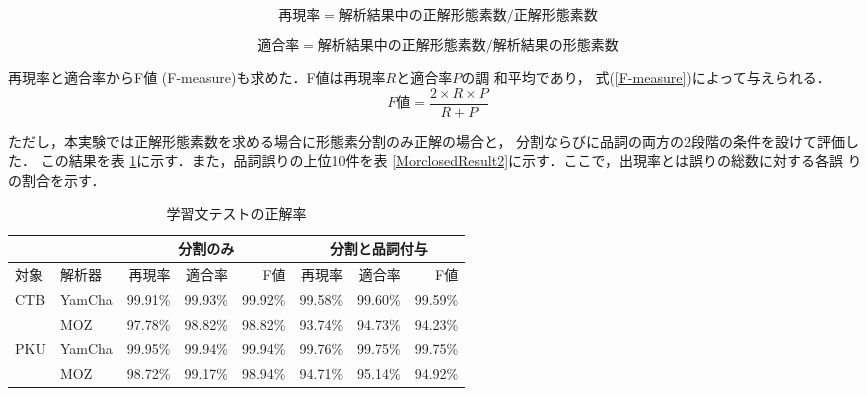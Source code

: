 \begin{equation}
 再現率 = 解析結果中の正解形態素数 / 正解形態素数
\label{recall}
\end{equation}

\begin{equation}
 適合率 = 解析結果中の正解形態素数 / 解析結果の形態素数
\label{precision} 
\end{equation}

再現率と適合率からF値 (F-measure)も求めた．F値は再現率$R$と適合率$P$の調
和平均であり，
式(\ref{F-measure})によって与えられる．
\begin{equation}
F値 = \frac{2 \times R \times P}{R + P}
\label{F-measure} 
\end{equation}

ただし，本実験では正解形態素数を求める場合に形態素分割のみ正解の場合と，
分割ならびに品詞の両方の2段階の条件を設けて評価した．
この結果を表
\ref{MorclosedTest}に示す．また，品詞誤りの上位10件を表
\ref{MorclosedResult2}に示す．ここで，出現率とは誤りの総数に対する各誤
りの割合を示す．

\begin{table}[htb]
  \begin{center}
   \caption{学習文テストの正解率}
   \label{MorclosedTest}
   \begin{tabular}{ll|rrr|rrr} 
\hline
&   &\multicolumn{3}{c}{分割のみ} & \multicolumn{3}{|c}{分割と品詞付与} \\
\hline
対象 &解析器 & 再現率 & 適合率 &F値    & 再現率 & 適合率 &F値\\ 
\hline
CTB  &YamCha & 99.91\%& 99.93\%&99.92\%& 99.58\%& 99.60\%&99.59\%\\ 
     &MOZ    & 97.78\%& 98.82\%&98.82\%& 93.74\%& 94.73\%&94.23\%\\ 
\hline
PKU  &YamCha & 99.95\%& 99.94\%&99.94\%& 99.76\%& 99.75\%&99.75\%\\
     &MOZ    & 98.72\%& 99.17\%&98.94\%& 94.71\%& 95.14\%&94.92\%\\
\hline
   \end{tabular}

  \end{center}
\end{table}

